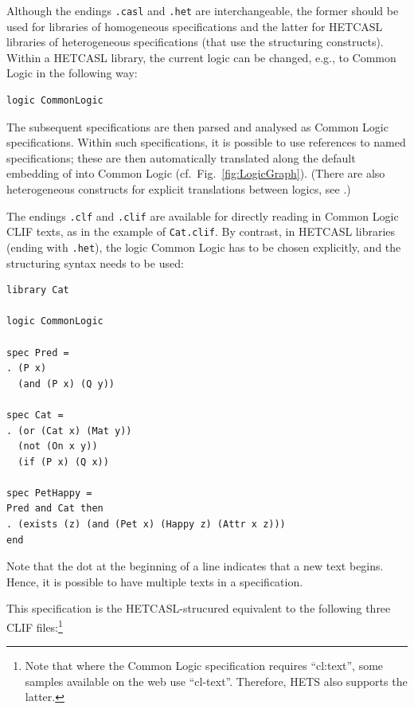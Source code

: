 \documentclass{article}
\newcommand{\normalTEXTSC}[2]{{#1\scriptsize#2}}
\newcommand     {\Hets}{\normalTEXTSC{H}{ETS}\xspace}
\newcommand{\HetCASL}{\normalTEXTSC{H}{ET}\normalTEXTSC{C}{ASL}\xspace}
\begin{document}
\medskip

Although the endings \texttt{.casl} and \texttt{.het} are
interchangeable, the former should be used for libraries of
homogeneous \CASL specifications and the latter for \HetCASL libraries
of heterogeneous specifications (that use the \CASL structuring
constructs). Within a \HetCASL library, the current logic can be changed, e.g.,
to Common Logic in the following way:

\begin{lstlisting}[morekeywords=logic]
logic CommonLogic
\end{lstlisting}

The subsequent specifications are then parsed and analysed as
Common Logic specifications. Within such specifications,
it is possible to use references to named \CASL specifications;
these are then automatically translated along the default
embedding of \CASL into Common Logic (cf.\ Fig.~\ref{fig:LogicGraph}).
(There are also heterogeneous constructs
for explicit translations between logics, see \cite{Mossakowski04}.)

The endings \texttt{.clf} and \texttt{.clif} are available for directly reading in
Common Logic CLIF texts, as in the example of \texttt{Cat.clif}.
By contrast, in \HetCASL libraries (ending with \texttt{.het}),
the logic Common Logic has to be chosen explicitly, and the \CASL structuring
syntax needs to be used:

\begin{lstlisting}[language=clif,morekeywords={library,logic,spec,then}]
library Cat

logic CommonLogic

spec Pred = 
. (P x)
  (and (P x) (Q y))

spec Cat =
. (or (Cat x) (Mat y))
  (not (On x y))
  (if (P x) (Q x))

spec PetHappy =
Pred and Cat then
. (exists (z) (and (Pet x) (Happy z) (Attr x z)))
end
\end{lstlisting}

Note that the dot at the beginning of a line indicates that a new text begins.
Hence, it is possible to have multiple texts in a \CASL specification.

This specification is the \HetCASL-strucured equivalent to the following three
CLIF files:\footnote{Note that where the Common Logic specification requires ``cl:text'', some samples available on the web use ``cl-text''. Therefore, \Hets also supports the latter.}\\
\end{document}
